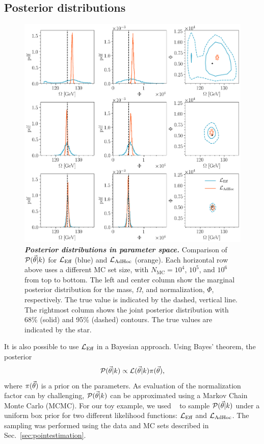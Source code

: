 \subsection{Posterior distributions}
\label{sec:posterior}

\begin{figure}[ht]
	\centering
	\includegraphics[width=1\linewidth]{figures/stats_paper/fig6}
	\caption{\textbf{\textit{Posterior distributions in parameter space.}} Comparison of $\mathcal{P}(\vec{\theta}|k)$ for $\mathcal{L}_\textmd{Eff}$ (blue) and $\mathcal{L}_{\textmd{AdHoc}}$ (orange). Each horizontal row above uses a different MC set size, with $N_\mathrm{MC}=10^4$, $10^5$, and $10^6$ from top to bottom. The left and center column show the marginal posterior distribution for the mass, $\Omega$, and normalization, $\Phi$, respectively. The true value is indicated by the dashed, vertical line. The rightmost column shows the joint posterior distribution with 68\% (solid) and 95\% (dashed) contours. The true values are indicated by the star.}
	\label{fig:llhdist}
\end{figure}

It is also possible to use $\mathcal{L}_\textmd{Eff}$ in a Bayesian approach. Using Bayes' theorem, the posterior
\begin{equation}
\mathcal{P}(\vec{\theta}|k) \propto \mathcal{L}(\vec{\theta}|k) \pi(\vec{\theta}),
\end{equation}
where $\pi(\vec{\theta})$ is a prior on the parameters. As evaluation of the normalization factor can by challenging, $\mathcal{P}(\vec{\theta}|k)$ can be approximated using a Markov Chain Monte Carlo (MCMC). For our toy example, we used \emcee{}~\cite{ForemanMackey:2012ig} to sample $\mathcal{P}(\vec{\theta}|k)$ under a uniform box prior for two different likelihood functions: $\mathcal{L}_\textmd{Eff}$ and $\mathcal{L}_{\textmd{AdHoc}}$. The sampling was performed using the data and MC sets described in Sec.~\ref{sec:pointestimation}.

